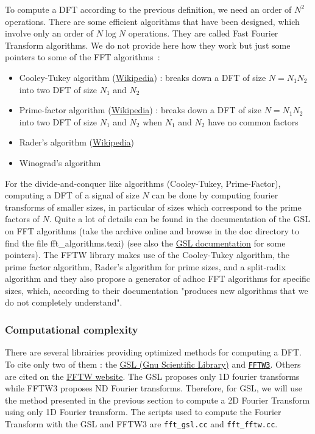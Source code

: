 \documentclass[a4paper,10pt,twoside]{article}
\begin{document}
To compute a DFT according to the previous definition, we need an order of $N^2$ operations. There are some efficient algorithms that have been designed, which involve only an order of $N \log N$ operations. They are called Fast Fourier Transform algorithms. We do not provide here how they work but just some pointers to some of the FFT algorithms~:
\begin{itemize}
\item Cooley-Tukey algorithm (\href{http://en.wikipedia.org/wiki/Cooley%E2%80%93Tukey_FFT_algorithm}{Wikipedia}) : breaks down a DFT of size $N = N_1 N_2$ into two DFT of size $N_1$ and $N_2$
\item Prime-factor algorithm (\href{http://en.wikipedia.org/wiki/Prime-factor_FFT_algorithm}{Wikipedia}) : breaks down a DFT of size $N = N_1 N_2$ into two DFT of size $N_1$ and $N_2$ when $N_1$ and $N_2$ have no common factors
\item Rader's algorithm (\href{http://en.wikipedia.org/wiki/Rader%27s_FFT_algorithm}{Wikipedia})
\item Winograd's algorithm
\end{itemize}
For the divide-and-conquer like algorithms (Cooley-Tukey, Prime-Factor), computing a DFT of a signal of size $N$ can be done by computing fourier transforms of smaller sizes, in particular of sizes which correspond to the prime factors of $N$. Quite a lot of details can be found in the documentation of the GSL on FFT algorithms (take the archive online and browse in the doc directory to find the file fft\_algorithms.texi) (see also the \href{http://www.gnu.org/software/gsl/manual/html_node/FFT-References-and-Further-Reading.html}{GSL documentation} for some pointers). The FFTW library makes use of the Cooley-Tukey algorithm, the prime factor algorithm, Rader's algorithm for prime sizes, and a split-radix algorithm and they also propose a generator of adhoc FFT algorithms for specific sizes, which, according to their documentation "produces new algorithms that we do not completely understand".

\subsubsection{Computational complexity}

There are several librairies providing optimized methods for computing a DFT. To cite only two of them : the \href{http://www.gnu.org/software/gsl}{GSL (Gnu Scientific Library)} and \href{http://www.fftw.org}{\nolinkurl{FFTW3}}. Others are cited on the \href{http://www.fftw.org/benchfft/ffts.html}{FFTW website}. The GSL proposes only 1D fourier transforms while FFTW3 proposes ND Fourier transforms. Therefore, for GSL, we will use the method presented in the previous section to compute a 2D Fourier Transform using only 1D Fourier transform. The scripts used to compute the Fourier Transform with the GSL and FFTW3 are \verb?fft_gsl.cc? and \verb?fft_fftw.cc?.\\
\end{document}
